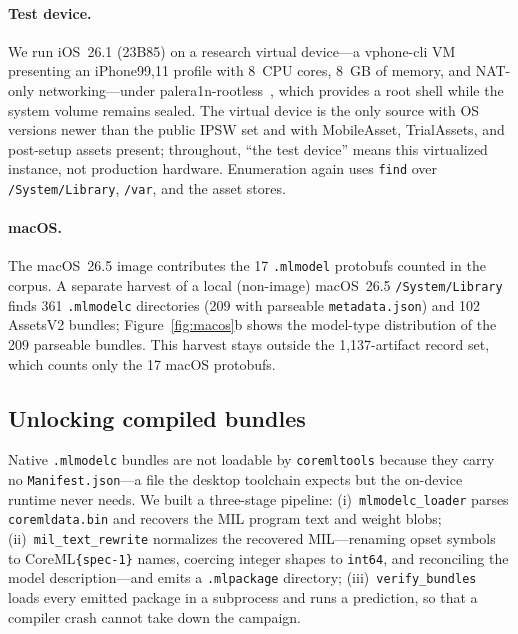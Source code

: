 \documentclass[letterpaper,twocolumn,10pt]{article}
\newcommand{\mlmodel}{\texttt{.mlmodel}\xspace}
\newcommand{\mlmodelc}{\texttt{.mlmodelc}\xspace}
\newcommand{\mlpackage}{\texttt{.mlpackage}\xspace}
\newcommand{\coremltools}{\texttt{coremltools}\xspace}
\begin{document}
\paragraph{Test device.}
We run iOS~26.1 (23B85) on a research virtual device---a
vphone-cli VM presenting an iPhone99,11 profile with 8~CPU cores, 8~GB of
memory, and NAT-only networking---under palera1n-rootless~\cite{palera1n},
which provides a root shell while the system volume remains sealed.
The virtual device is the only source with OS versions newer than the
public IPSW set and with MobileAsset, TrialAssets, and post-setup assets
present; throughout, ``the test device'' means this virtualized instance,
not production hardware.
Enumeration again uses \texttt{find} over
\texttt{/System/Library}, \texttt{/var}, and the asset stores.

\paragraph{macOS.}
The macOS~26.5 image contributes the 17 \mlmodel{} protobufs counted in
the corpus.
A separate harvest of a local (non-image) macOS~26.5
\texttt{/System/Library} finds 361 \mlmodelc{} directories (209 with
parseable \texttt{metadata.json}) and 102 AssetsV2 bundles;
Figure~\ref{fig:macos}b shows the model-type distribution of the 209
parseable bundles.
This harvest stays outside the 1{,}137-artifact record set, which counts
only the 17 macOS protobufs.

\subsection{Unlocking compiled bundles}
\label{sec:conversion}

Native \mlmodelc{} bundles are not loadable by \coremltools{} because they
carry no \texttt{Manifest.json}---a file the desktop toolchain expects but
the on-device runtime never needs. We built a three-stage pipeline:
(i)~\texttt{mlmodelc\_loader} parses \texttt{coremldata.bin} and recovers
the MIL program text and weight blobs;
(ii)~\texttt{mil\_text\_rewrite} normalizes the recovered MIL---renaming
opset symbols to CoreML\texttt{\{spec-1\}} names, coercing integer shapes to
\texttt{int64}, and reconciling the model description---and emits a
\mlpackage{} directory;
(iii)~\texttt{verify\_bundles} loads every emitted package in a subprocess
and runs a prediction, so that a compiler crash cannot take down the
campaign.
\end{document}
